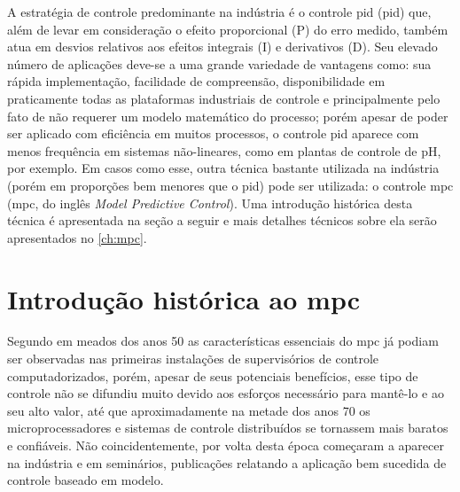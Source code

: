 A estratégia de controle predominante na indústria é o controle \acrshort{pid}
(\acrlong{pid}) que, além de levar em consideração o efeito proporcional (P) do erro
medido, também atua em desvios relativos aos efeitos integrais (I) e derivativos (D).
Seu elevado número de aplicações deve-se a uma grande variedade de vantagens como:
sua rápida implementação, facilidade de compreensão, disponibilidade em praticamente
todas as plataformas industriais de controle e principalmente pelo fato de não requerer
um modelo matemático do processo; porém apesar de poder ser aplicado com eficiência em
muitos processos, o controle \acrshort{pid} aparece com menos frequência
em sistemas não-lineares, como em plantas de controle de pH, por exemplo. Em casos como
esse, outra técnica bastante utilizada na indústria (porém em proporções bem menores
que o \acrshort{pid}) pode ser utilizada: o controle \acrshort{mpc} (\acrlong{mpc},
do inglês \textit{Model Predictive Control}). Uma introdução histórica desta técnica é apresentada
na seção a seguir e mais detalhes técnicos sobre ela serão apresentados no \cref{ch:mpc}.


\section{Introdução histórica ao \acrshort{mpc}}
\label{sec:intro_mpc}

Segundo  em meados dos anos 50 as características essenciais do \acrshort{mpc}
já podiam ser observadas nas primeiras instalações de supervisórios de controle computadorizados,
porém, apesar de seus potenciais benefícios, esse tipo de controle não se difundiu muito
devido aos esforços necessário para mantê-lo e ao seu alto valor, até que aproximadamente
na metade dos anos 70 os microprocessadores e sistemas de controle distribuídos se tornassem
mais baratos e confiáveis. Não coincidentemente, por volta desta época começaram a aparecer na indústria
e em seminários, publicações relatando a aplicação bem sucedida de controle baseado em modelo. \cite{Lee2011}

